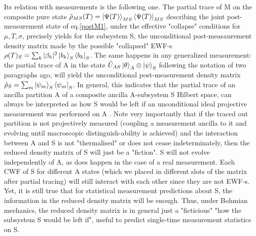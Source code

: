 \documentclass[11pt, a4paper]{article} %
\begin{document}
Its relation with measurements is the following one. The partial trace of M on the composite pure state $\hat{\rho}_{MS}(T)=\ket{\Psi(T)}_{MS}\bra{\Psi(T)}_{MS}$ describing the joint post-measurement state of eq.\eqref{postM1}, under the effective "collapse" conditions for $\mu,T,\sigma$, precisely yields for the subsystem S, the unconditional post-measaurement density matrix made by the possible "collapsed" EWF-s $\rho(T)_S=\sum_k |\beta_k|^2\ket{b_k}_S\bra{b_k}_S$. The same happens in any generalized measurement: the partial trace of A in the state $\hat{U}_{AS}\ket{\theta}_A\otimes\ket{\psi}_S$ following the notation of two paragraphs ago, will yield the unconditional post-measurement density matrix $\hat{\rho}_S=\sum_m \ket{\psi_m}_S\bra{\psi_m}_S$. In general, this indicates that the partial trace of an ancilla partition A of a composite ancilla A-subsystem S Hilbert space, can always be interpreted as how S would be left if an unconditional ideal projective measurement was performed on A \cite{Generalized}. Note very importantly that if the traced out partition is not projectively measured (coupling a measurement ancilla to it and evolving until macroscopic distinguish-ability is achieved) and the interaction between A and S is not "thermalised" or does not cease indeterminately, then the reduced density matrix of S will just be a "fiction". S will not evolve independently of A, as does happen in the case of a real measurement. Each CWF of S for different A states (which we placed in different slots of the matrix after partial tracing) will still interact with each other since they are not EWF-s. Yet, it is still true that for statistical measurement predictions about S, the information in the reduced density matrix will be enough. Thus, under Bohmian mechanics, the reduced density matrix is in general just a "ficticious" "how the subsystem S would be left if", useful to predict single-time measurement statistics on S. %
\end{document}
